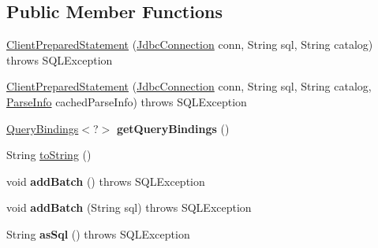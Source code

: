 \subsection*{Public Member Functions}
\begin{DoxyCompactItemize}
\item 
\mbox{\hyperlink{classcom_1_1mysql_1_1cj_1_1jdbc_1_1_client_prepared_statement_afb74bdcedd39ca4b9966cfa26abe4b8b}{Client\+Prepared\+Statement}} (\mbox{\hyperlink{interfacecom_1_1mysql_1_1cj_1_1jdbc_1_1_jdbc_connection}{Jdbc\+Connection}} conn, String sql, String catalog)  throws S\+Q\+L\+Exception 
\item 
\mbox{\hyperlink{classcom_1_1mysql_1_1cj_1_1jdbc_1_1_client_prepared_statement_aa5e87b6277bf7625290f892273da82c2}{Client\+Prepared\+Statement}} (\mbox{\hyperlink{interfacecom_1_1mysql_1_1cj_1_1jdbc_1_1_jdbc_connection}{Jdbc\+Connection}} conn, String sql, String catalog, \mbox{\hyperlink{classcom_1_1mysql_1_1cj_1_1_parse_info}{Parse\+Info}} cached\+Parse\+Info)  throws S\+Q\+L\+Exception 
\item 
\mbox{\label{classcom_1_1mysql_1_1cj_1_1jdbc_1_1_client_prepared_statement_aa7710948c9da0ab8fc0591a3b7054c4d}} 
\mbox{\hyperlink{interfacecom_1_1mysql_1_1cj_1_1_query_bindings}{Query\+Bindings}}$<$?$>$ {\bfseries get\+Query\+Bindings} ()
\item 
String \mbox{\hyperlink{classcom_1_1mysql_1_1cj_1_1jdbc_1_1_client_prepared_statement_adbbbd2407424c34277a0699d7be261b4}{to\+String}} ()
\item 
\mbox{\label{classcom_1_1mysql_1_1cj_1_1jdbc_1_1_client_prepared_statement_aad5a8e892856f06b5c1ea3bd43750213}} 
void {\bfseries add\+Batch} ()  throws S\+Q\+L\+Exception 
\item 
\mbox{\label{classcom_1_1mysql_1_1cj_1_1jdbc_1_1_client_prepared_statement_a848bc9a8b6ea7b0149e2005c0ee48114}} 
void {\bfseries add\+Batch} (String sql)  throws S\+Q\+L\+Exception 
\item 
\mbox{\label{classcom_1_1mysql_1_1cj_1_1jdbc_1_1_client_prepared_statement_a461d64dc00a3441272a3715ac343a121}} 
String {\bfseries as\+Sql} ()  throws S\+Q\+L\+Exception 

\end{DoxyCompactItemize}
